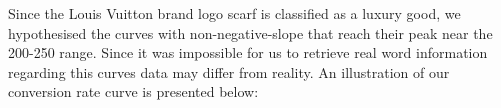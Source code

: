Since the Louis Vuitton brand logo scarf is classified as a luxury good, we hypothesised the curves with non-negative-slope that reach their peak near the 200-250 \EUR{} range. Since it was impossible for us to retrieve real word information regarding this curves data may differ from reality. An illustration of our conversion rate curve is presented below:\newline
{} 